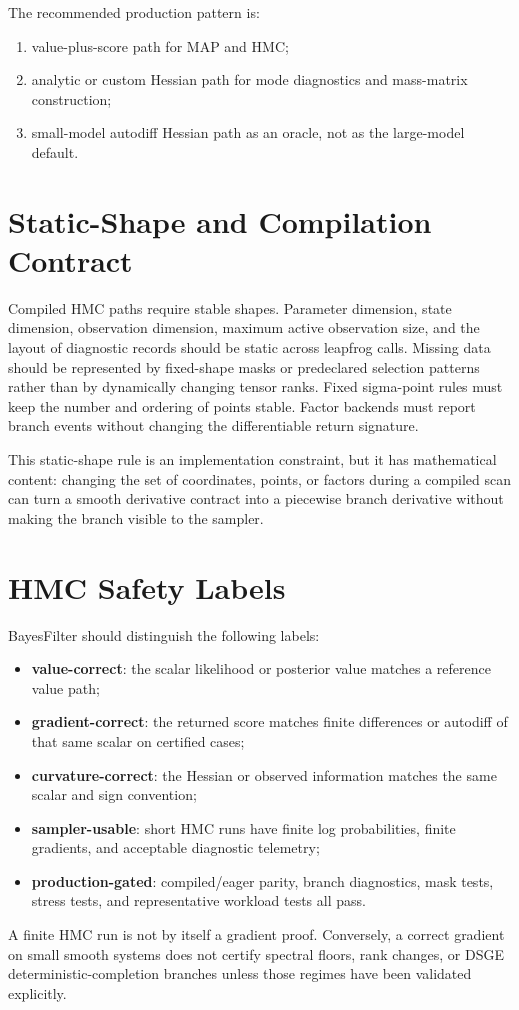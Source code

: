 The recommended production pattern is:
\begin{enumerate}[label=(\roman*)]
  \item value-plus-score path for MAP and HMC;
  \item analytic or custom Hessian path for mode diagnostics and mass-matrix
    construction;
  \item small-model autodiff Hessian path as an oracle, not as the large-model
    default.
\end{enumerate}

\section{Static-Shape and Compilation Contract}
\label{sec:bf-custom-gradient-static-shapes}

Compiled HMC paths require stable shapes.  Parameter dimension, state dimension,
observation dimension, maximum active observation size, and the layout of
diagnostic records should be static across leapfrog calls.  Missing data should
be represented by fixed-shape masks or predeclared selection patterns rather
than by dynamically changing tensor ranks.  Fixed sigma-point rules must keep the
number and ordering of points stable.  Factor backends must report branch events
without changing the differentiable return signature.

This static-shape rule is an implementation constraint, but it has mathematical
content: changing the set of coordinates, points, or factors during a compiled
scan can turn a smooth derivative contract into a piecewise branch derivative
without making the branch visible to the sampler.

\section{HMC Safety Labels}
\label{sec:bf-custom-gradient-hmc-labels}

BayesFilter should distinguish the following labels:
\begin{itemize}
  \item \textbf{value-correct}: the scalar likelihood or posterior value matches
    a reference value path;
  \item \textbf{gradient-correct}: the returned score matches finite
    differences or autodiff of that same scalar on certified cases;
  \item \textbf{curvature-correct}: the Hessian or observed information matches
    the same scalar and sign convention;
  \item \textbf{sampler-usable}: short HMC runs have finite log probabilities,
    finite gradients, and acceptable diagnostic telemetry;
  \item \textbf{production-gated}: compiled/eager parity, branch diagnostics,
    mask tests, stress tests, and representative workload tests all pass.
\end{itemize}
A finite HMC run is not by itself a gradient proof.  Conversely, a correct
gradient on small smooth systems does not certify spectral floors, rank changes,
or DSGE deterministic-completion branches unless those regimes have been
validated explicitly.
